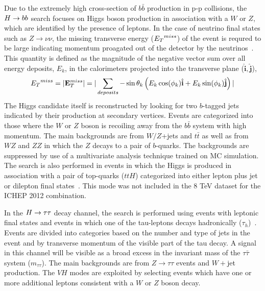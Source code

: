 Due to the extremely high cross-section of $b\bar{b}$ production in 
p-p collisions, the $H\rightarrow bb$ search focuses on Higgs boson production in association
with a $W$ or $Z$, which are identified by the presence of leptons. In the case 
of neutrino final states such as $Z\rightarrow \nu\nu$, the missing transverse energy 
(${E_{T}}^{miss}$) of the event is requred to be large indicating momentum proagated out of the detector by the neutrinos~\citep{HIG-12-019}. 
This quantity is defined as the magnitude of the negative vector sum over all energy deposits, 
$E_{k}$, in the calorimeters projected into the transverse plane 
 ($\hat{\mathbf{i}},\hat{\mathbf{j}}$),
\begin{equation}
{E_{T}}^{miss} = |{\mathbf{E}^{miss}_{T}}| =|\sum_{deposits} -\sin\theta_{k}\left(E_{k}\cos(\phi_{k})\hat{\mathbf{i}}+E_{k}\sin(\phi_{k})\hat{\mathbf{j}}\right)|
\end{equation}
The Higgs candidate itself is reconstructed by looking for two 
$b$-tagged jets indicated by their production at secondary vertices. Events are 
categorized into those where the 
$W$ or $Z$ boson is recoiling away from the $b\bar{b}$ system with high momentum.
The main backgrounds are from $W/Z$+jets and $t\bar{t}$ as well as from $WZ$ and $ZZ$
in which the $Z$ decays to a pair of $b$-quarks. The backgrounds are suppressed
by use of a multivariate analysis technique trained on MC simulation.
The search is also performed in events in which the Higgs is produced in association
with a pair of top-quarks ($ttH$) categorized into either lepton plus jet or dilepton 
final states~\citep{HIG-12-019}. This mode was not included in the 8 TeV dataset
for the ICHEP 2012 combination.

In the $H\rightarrow\tau\tau$ decay channel, the search is performed using events with leptonic
final states and events in which one of the tau-leptons decays hadronically 
($\tau_{h}$)~\citep{HIG-12-018}.
Events are divided into categories based on the number and type of jets in the event
and by transverse momentum of the visible part of the tau decay.
A signal in this channel will be visible as a broad excess in the invariant mass
of the $\tau\bar{\tau}$ system ($m_{\tau\tau}$). The main backgrounds are from
$Z\rightarrow\tau\tau$ events and $W+$jet production. The $VH$ modes are
exploited by selecting events which have one or more additional leptons 
consistent with a $W$ or $Z$ boson decay.

